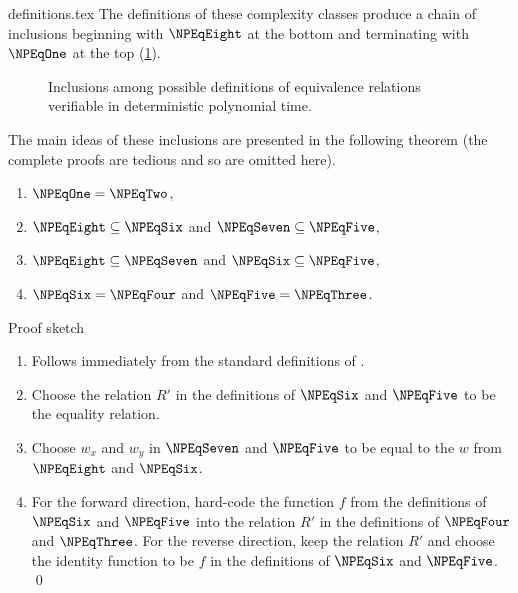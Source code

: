 \begin{filecontents}{definitions.tex}
The definitions of these complexity classes produce a chain of inclusions beginning with $\NPEqEight$ at the bottom and terminating with $\NPEqOne$ at the top (\ref{fig:inclusions}).
\begin{figure}
  \caption{\label{fig:inclusions}Inclusions among possible definitions of equivalence relations verifiable in deterministic polynomial time.}
  \begin{center}
  \end{center}
\end{figure}
The main ideas of these inclusions are presented in the following theorem (the complete proofs are tedious and so are omitted here).
\begin{theorem}\label{thm:definitions}\mbox{}
  \begin{enumerate}
  \item $\NPEqOne = \NPEqTwo$,
  \item $\NPEqEight \subseteq \NPEqSix$ and $\NPEqSeven \subseteq \NPEqFive$,
  \item $\NPEqEight \subseteq \NPEqSeven$ and $\NPEqSix \subseteq \NPEqFive$,
  \item $\NPEqSix = \NPEqFour$ and $\NPEqFive = \NPEqThree$.
  \end{enumerate}
\end{theorem}
\begin{namedproof}{Proof sketch}\mbox{}
  \begin{enumerate}
  \item Follows immediately from the standard definitions of \NP.
  \item Choose the relation $R'$ in the definitions of $\NPEqSix$ and $\NPEqFive$ to be the equality relation.
  \item Choose $w_x$ and $w_y$ in $\NPEqSeven$ and $\NPEqFive$ to be equal to the $w$ from $\NPEqEight$ and $\NPEqSix$.
  \item
    For the forward direction, hard-code the function $f$ from the definitions of $\NPEqSix$ and $\NPEqFive$ into the relation $R'$ in the definitions of $\NPEqFour$ and $\NPEqThree$.
    For the reverse direction, keep the relation $R'$ and choose the identity function to be $f$ in the definitions of $\NPEqSix$ and $\NPEqFive$.
    \qed
  \end{enumerate}
\end{namedproof}


\end{filecontents}

